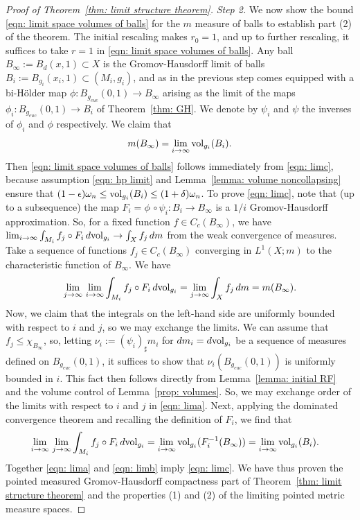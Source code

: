 \documentclass[11pt,reqno]{amsart}
\theoremstyle{remark}
\theoremstyle{definition}
\numberwithin{equation}{section}
\newcommand{\e}{{\epsilon}}
\newcommand{\om}{\omega}
\newcommand{\vol}{{\rm{vol}}}
\begin{document}
\begin{proof}[Proof of Theorem~\ref{thm: limit structure theorem}]
 
{\it Step 2.} We now show the bound \eqref{eqn: limit space volumes of balls} for the $m$ measure of balls to establish part (2) of the theorem. The initial rescaling makes $r_0=1$, and up to further rescaling, it suffices to take $r=1$ in \eqref{eqn: limit space volumes of balls}.  Any ball $B_{\infty}:=B_d(x,1)\subset X$ is the Gromov-Hausdorff limit of balls $B_i:=B_{g_i}(x_i,1)\subset (M_i,g_i)$, and as in the previous step comes equipped with a bi-H\"{o}lder map $\phi: B_{g_{euc}}(0,1)\to B_\infty$ arising as the limit of the maps $\phi_i:B_{g_{euc}}(0,1)\to B_i$ of Theorem~\ref{thm: GH}. We denote by $\psi_i$ and $\psi$ the inverses of $\phi_i$ and $\phi$ respectively. We claim that 
 \begin{equation}\label{eqn: limc}
 	m(B_\infty) = \lim_{i\to \infty}\vol_{g_i}(B_i).
 \end{equation}
Then \eqref{eqn: limit space volumes of balls} follows immediately from \eqref{eqn: limc}, because assumption \eqref{eqn: hp limit} and Lemma~\ref{lemma: volume noncollapsing} ensure that $(1-\e) \omega_n \leq \vol_{g_i}(B_i) \leq (1+\delta) \om_n $.
 To prove \eqref{eqn: limc}, note that (up to a subsequence) the map $F_i= \phi\,\circ\psi_i:B_i\to B_\infty$ is a $1/i$ Gromov-Hausdorff approximation. 
 So, for a fixed function $f \in C_c(B_\infty)$,  we have $\lim_{i\to\infty}\int_{M_i} f_j\circ F_i\,d\vol_{g_i} \to  \int_X f_j\,dm$ from the weak convergence of measures.
 Take  a sequence of functions  $f_j \in C_c(B_\infty)$  converging in $L^1(X;m)$ to the characteristic function of $B_\infty.$ We have 
 \begin{equation}\label{eqn: lima}
 	\lim_{j\to\infty}\, \lim_{i\to\infty}\int_{M_i} f_j\circ F_i\,d\vol_{g_i}=\lim_{j\to\infty} \int_X f_j\,dm=m(B_\infty).
 \end{equation} 
 Now, we claim that the integrals on the left-hand side are uniformly bounded with respect to $i$ and $j$, so we may exchange the limits. We can assume that $f_j \leq \chi_{B_\infty}$, so, letting $\nu_i := (\psi_i)_\sharp m_i$ for $dm_i = d\vol_{g_i}$ be a sequence of measures defined on $B_{g_{euc}}(0, 1)$, it suffices to show that $\nu_i(B_{g_{euc}}(0,1))$ is uniformly bounded in $i$.  This fact then follows directly from Lemma~\ref{lemma: initial RF} and the volume control of Lemma~\ref{prop: volumes}. So, we may exchange order of the limits with respect to $i$ and $j$  in \eqref{eqn: lima}.
Next, applying the dominated convergence theorem and recalling the definition of $F_i$, we  find that 
 \begin{equation}\label{eqn: limb}
 	\begin{split}
 	\lim_{i\to\infty}\, \lim_{j\to\infty}\int_{M_i} f_j\circ F_i \,d\vol_{g_i}&= \lim_{i\to\infty} \vol_{g_i}(F_i^{-1}(B_\infty))  =\lim_{i\to\infty} \vol_{g_i}(B_i) .	
 	\end{split}
 \end{equation}
Together \eqref{eqn: lima} and \eqref{eqn: limb} imply \eqref{eqn: limc}.
We have thus proven the pointed measured Gromov-Hausdorff  compactness part of Theorem~\ref{thm: limit structure theorem} and the properties (1) and (2) of the limiting pointed metric measure spaces.
 \end{proof}
\end{document}
